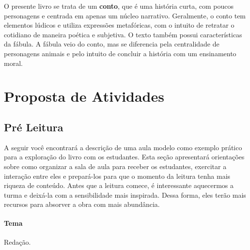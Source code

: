 \documentclass[11pt]{extarticle}
\begin{document}
O presente livro se trata de um \textbf{conto}, que é uma história curta, com poucos personagens e centrada em apenas um núcleo narrativo. Geralmente, o conto tem elementos lúdicos e utiliza expressões metafóricas, com o intuito de retratar o cotidiano de maneira poética e subjetiva. O texto também possui características da fábula. A fábula veio do conto, mas se diferencia pela centralidade de personagens animais e pelo intuito de concluir a história com um ensinamento moral.

\section{Proposta de Atividades}
\subsection{Pré Leitura}

A seguir você encontrará a descrição de uma aula modelo como exemplo prático para a exploração do livro com os estudantes. Esta seção apresentará orientações sobre como organizar a sala de aula para receber os estudantes, exercitar a interação entre eles e prepará-los para que o momento da leitura tenha mais riqueza de conteúdo. Antes que a leitura comece, é interessante aquecermos a turma e deixá-la com a sensibilidade mais inspirada. Dessa forma, eles terão mais recursos para absorver a obra com mais abundância.


\paragraph{Tema} Redação. 
\end{document}

